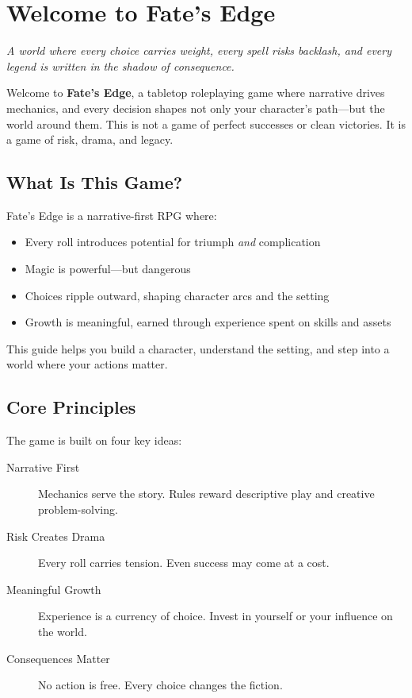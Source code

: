 \chapter{Welcome to Fate's Edge} \label{ch:intro}

\begin{multicols}{2}

\emph{A world where every choice carries weight, every spell risks backlash, and every legend is written in the shadow of consequence.}

Welcome to \textbf{Fate's Edge}, a tabletop roleplaying game where narrative drives mechanics, and every decision shapes not only your character's path—but the world around them. This is not a game of perfect successes or clean victories. It is a game of risk, drama, and legacy.

\section*{What Is This Game?} 

Fate's Edge is a narrative-first RPG where: \begin{itemize} \item Every roll introduces potential for triumph \emph{and} complication \item Magic is powerful—but dangerous \item Choices ripple outward, shaping character arcs and the setting \item Growth is meaningful, earned through experience spent on skills and assets \end{itemize}

This guide helps you build a character, understand the setting, and step into a world where your actions matter.

\section*{Core Principles} 

The game is built on four key ideas:

\begin{description} \item[Narrative First] Mechanics serve the story. Rules reward descriptive play and creative problem-solving. \item[Risk Creates Drama] Every roll carries tension. Even success may come at a cost. \item[Meaningful Growth] Experience is a currency of choice. Invest in yourself or your influence on the world. \item[Consequences Matter] No action is free. Every choice changes the fiction. \end{description}


\end{multicols}

